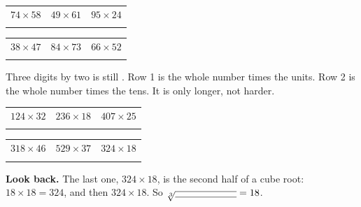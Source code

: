 \documentclass[12pt,a4paper]{article}
\begin{document}
\vspace{9pt}
\noindent
\begin{tabularx}{\textwidth}{|X|X|X|}
  \hline
  $74 \times 58$ & $49 \times 61$ & $95 \times 24$ \\
  \rule[-3.3em]{0pt}{4.1em} & & \\
  \hline
\end{tabularx}

\vspace{9pt}
\noindent
\begin{tabularx}{\textwidth}{|X|X|X|}
  \hline
  $38 \times 47$ & $84 \times 73$ & $66 \times 52$ \\
  \rule[-3.3em]{0pt}{4.1em} & & \\
  \hline
\end{tabularx}


\begin{remember}
  Three digits by two is still . Row 1 is the whole number times the
  units. Row 2 is the whole number times the tens. It is only longer, not harder.
\end{remember}

\vspace{2pt}
\noindent
\begin{tabularx}{\textwidth}{|X|X|X|}
  \hline
  $124 \times 32$ & $236 \times 18$ & $407 \times 25$ \\
  \rule[-3.7em]{0pt}{4.5em} & & \\
  \hline
\end{tabularx}

\vspace{9pt}
\noindent
\begin{tabularx}{\textwidth}{|X|X|X|}
  \hline
  $318 \times 46$ & $529 \times 37$ & $324 \times 18$ \\
  \rule[-3.7em]{0pt}{4.5em} & & \\
  \hline
\end{tabularx}

\vspace{9pt}
\noindent\textbf{Look back.} The last one, $324 \times 18$, is the second half of a
cube root: $18 \times 18 = 324$, and then $324 \times 18$. So
$\sqrt[3]{\blank[2.2cm]} = 18$.

\end{document}
